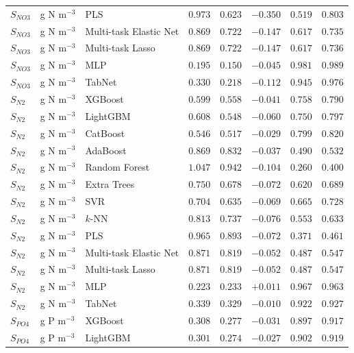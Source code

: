 \begin{longtable}{llp{3.1cm}rrrrr}
$S_{NO3}$ & g N m$^{-3}$ & PLS & $0.973$ & $0.623$ & $-0.350$ & $0.519$ & $0.803$ \\
$S_{NO3}$ & g N m$^{-3}$ & Multi-task Elastic Net & $0.869$ & $0.722$ & $-0.147$ & $0.617$ & $0.735$ \\
$S_{NO3}$ & g N m$^{-3}$ & Multi-task Lasso & $0.869$ & $0.722$ & $-0.147$ & $0.617$ & $0.736$ \\
$S_{NO3}$ & g N m$^{-3}$ & MLP & $0.195$ & $0.150$ & $-0.045$ & $0.981$ & $0.989$ \\
$S_{NO3}$ & g N m$^{-3}$ & TabNet & $0.330$ & $0.218$ & $-0.112$ & $0.945$ & $0.976$ \\
$S_{N2}$ & g N m$^{-3}$ & XGBoost & $0.599$ & $0.558$ & $-0.041$ & $0.758$ & $0.790$ \\
$S_{N2}$ & g N m$^{-3}$ & LightGBM & $0.608$ & $0.548$ & $-0.060$ & $0.750$ & $0.797$ \\
$S_{N2}$ & g N m$^{-3}$ & CatBoost & $0.546$ & $0.517$ & $-0.029$ & $0.799$ & $0.820$ \\
$S_{N2}$ & g N m$^{-3}$ & AdaBoost & $0.869$ & $0.832$ & $-0.037$ & $0.490$ & $0.532$ \\
$S_{N2}$ & g N m$^{-3}$ & Random Forest & $1.047$ & $0.942$ & $-0.104$ & $0.260$ & $0.400$ \\
$S_{N2}$ & g N m$^{-3}$ & Extra Trees & $0.750$ & $0.678$ & $-0.072$ & $0.620$ & $0.689$ \\
$S_{N2}$ & g N m$^{-3}$ & SVR & $0.704$ & $0.635$ & $-0.069$ & $0.665$ & $0.728$ \\
$S_{N2}$ & g N m$^{-3}$ & $k$-NN & $0.813$ & $0.737$ & $-0.076$ & $0.553$ & $0.633$ \\
$S_{N2}$ & g N m$^{-3}$ & PLS & $0.965$ & $0.893$ & $-0.072$ & $0.371$ & $0.461$ \\
$S_{N2}$ & g N m$^{-3}$ & Multi-task Elastic Net & $0.871$ & $0.819$ & $-0.052$ & $0.487$ & $0.547$ \\
$S_{N2}$ & g N m$^{-3}$ & Multi-task Lasso & $0.871$ & $0.819$ & $-0.052$ & $0.487$ & $0.547$ \\
$S_{N2}$ & g N m$^{-3}$ & MLP & $0.223$ & $0.233$ & $+0.011$ & $0.967$ & $0.963$ \\
$S_{N2}$ & g N m$^{-3}$ & TabNet & $0.339$ & $0.329$ & $-0.010$ & $0.922$ & $0.927$ \\
$S_{PO4}$ & g P m$^{-3}$ & XGBoost & $0.308$ & $0.277$ & $-0.031$ & $0.897$ & $0.917$ \\
$S_{PO4}$ & g P m$^{-3}$ & LightGBM & $0.301$ & $0.274$ & $-0.027$ & $0.902$ & $0.919$ \\

\end{longtable}
